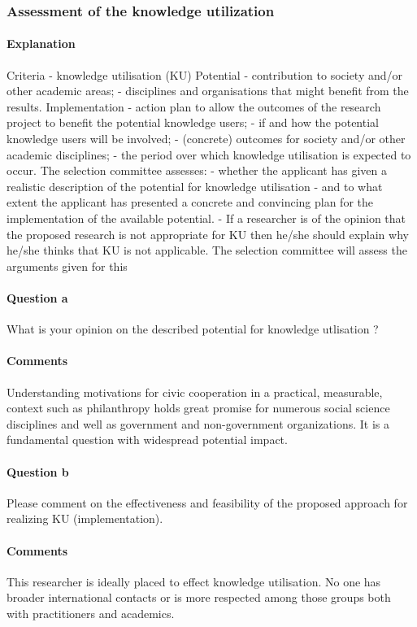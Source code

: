 \documentclass[twocolumn, serif, rga, numeric]{jote-article}
\begin{document}
\subsubsection{Assessment of the knowledge utilization}
\paragraph{Explanation}
Criteria - knowledge utilisation (KU) Potential - contribution to society and/or other academic areas; - disciplines and organisations that might benefit from the results. Implementation - action plan to allow the outcomes of the research project to benefit the potential knowledge users; - if and how the potential knowledge users will be involved; - (concrete) outcomes for society and/or other academic disciplines; - the period over which knowledge utilisation is expected to occur. The selection committee assesses: - whether the applicant has given a realistic description of the potential for knowledge utilisation - and to what extent the applicant has presented a concrete and convincing plan for the implementation of the available potential. - If a researcher is of the opinion that the proposed research is not appropriate for KU then he/she should explain why he/she thinks that KU is not applicable. The selection committee will assess the arguments given for this
\paragraph{Question a}
What is your opinion on the described potential for knowledge utlisation ?
\paragraph{Comments}
Understanding motivations for civic cooperation in a practical, measurable, context such as philanthropy holds great promise for numerous social science disciplines and well as government and non-government organizations. It is a fundamental question with widespread potential impact.
\paragraph{Question b}
Please comment on the effectiveness and feasibility of the proposed approach for realizing KU (implementation).
\paragraph{Comments}
This researcher is ideally placed to effect knowledge utilisation. No one has broader international contacts or is more respected among those groups both with practitioners and academics.
\end{document}
